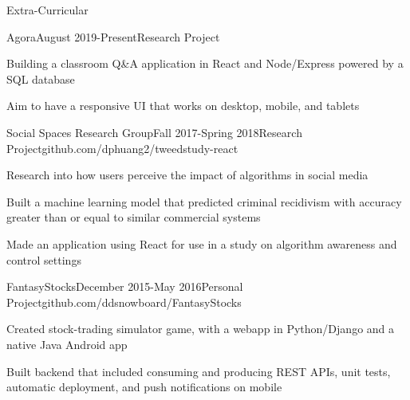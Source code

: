 \documentclass{resume} %
\begin{document}
    \begin{rSection}{Extra-Curricular} \itemsep -3pt
        \begin{rSubsection}{Agora}{August 2019-Present}{Research Project}{}
        \item Building a classroom Q\&A application in React and Node/Express powered by a SQL database
        \item Aim to have a responsive UI that works on desktop, mobile, and tablets
        \end{rSubsection}

        \begin{rSubsection}{Social Spaces Research Group}{Fall 2017-Spring 2018}{Research Project}{github.com/dphuang2/tweedstudy-react}{}
        \item Research into how users perceive the impact of algorithms in social media
        \item Built a machine learning model that predicted criminal recidivism with accuracy greater than or equal to similar commercial systems
        \item Made an application using React for use in a study on algorithm awareness and control settings
        \end{rSubsection}

        \begin{rSubsection}{FantasyStocks}{December 2015-May 2016}{Personal Project}{github.com/ddsnowboard/FantasyStocks}
        \item Created stock-trading simulator game, with a webapp in Python/Django and a native Java Android app
        \item Built backend that included consuming and producing REST APIs, unit tests, automatic deployment, and push notifications on mobile
        \end{rSubsection}
    \end{rSection}

    
\end{document}
